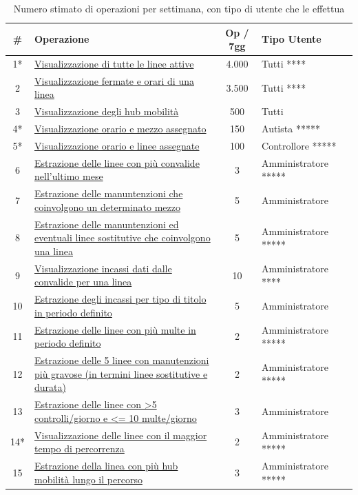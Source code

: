 \documentclass[12pt,a4paper]{report}
\begin{document}
\begin{longtable}{|c|p{9cm}|c|l|l|}
\caption{Numero stimato di operazioni per settimana, con tipo di utente che le effettua}
\label{table:operazioni}\\
\hline
\textbf{\#} & \textbf{Operazione} & \textbf{Op / 7gg} & \textbf{Tipo Utente} \\
\hline
\endhead
1*  & \hyperref[op1]{Visualizzazione di tutte le linee attive} & 4.000 & Tutti **** \\
\hline
2 & \hyperref[op2]{Visualizzazione fermate e orari di una linea} & 3.500 & Tutti **** \\
\hline
3 & \hyperref[op3]{Visualizzazione degli hub mobilità} & 500 & Tutti \\
\hline
4* & \hyperref[op4]{Visualizzazione orario e mezzo assegnato} & 150 & Autista ***** \\
\hline
5* & \hyperref[op5]{Visualizzazione orario e linee assegnate} & 100 & Controllore ***** \\
\hline
6 & \hyperref[op6]{Estrazione delle linee con più convalide nell'ultimo mese} & 3 & Amministratore *****  \\
\hline
7 & \hyperref[op7]{Estrazione delle manuntenzioni che coinvolgono un determinato mezzo} & 5 & Amministratore \\
\hline
8 & \hyperref[op8]{Estrazione delle manuntenzioni ed eventuali linee sostitutive che coinvolgono una linea} & 5 & Amministratore ***** \\
\hline
9 & \hyperref[op9]{Visualizzazione incassi dati dalle convalide per una linea} & 10 & Amministratore **** \\
\hline
10 & \hyperref[op10]{Estrazione degli incassi per tipo di titolo in periodo definito} & 5 & Amministratore \\
\hline
11 & \hyperref[op11]{Estrazione delle linee con più multe in periodo definito} & 2 & Amministratore ***** \\
\hline
12 & \hyperref[op12]{Estrazione delle 5 linee con manutenzioni più gravose (in termini linee sostitutive e durata)} & 2 & Amministratore *****  \\
\hline
13 & \hyperref[op13]{Estrazione delle linee con \textgreater 5 controlli/giorno e \textless = 10 multe/giorno} & 3 & Amministratore  \\
\hline
14* & \hyperref[op14]{Visualizzazione delle linee con il maggior tempo di percorrenza} & 2 & Amministratore ***** \\
\hline
15 & \hyperref[op15]{Estrazione della linea con più hub mobilità lungo il percorso} & 3 & Amministratore ***** \\

\end{longtable}
\end{document}
